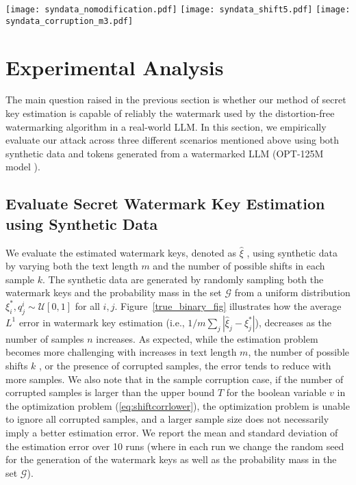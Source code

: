 \begin{figure*}[ht]
    \centering
    \texttt{[image: syndata\_nomodification.pdf]}
    \texttt{[image: syndata\_shift5.pdf]}
    \texttt{[image: syndata\_corruption\_m3.pdf]}
    \caption{Average estimation error for the watermark keys versus sample sizes, in the no-alteration (left), the shifting case (center), and the sample corruption case (right), using synthetic data. The estimation error decreases as more samples $n$ are available, although the text length $m$, the potential shift $k$ and the number of corrupted samples make the estimation problem more challenging. We report the mean and standard deviation over 10 runs (see text for more details).}
    \label{true_binary_fig}
\end{figure*}

\section{Experimental Analysis}
\label{sec:experiment}

The main question raised in the previous section is whether our method of secret key estimation is capable of reliably  the watermark used by the distortion-free watermarking algorithm \citep{kuditipudi2024robust} in a real-world LLM. In this section, we empirically evaluate our  attack across three different scenarios mentioned above using both synthetic data and tokens generated from a watermarked LLM (OPT-125M model \citealt{zhang2022opt}). 


\subsection{Evaluate Secret Watermark Key Estimation using Synthetic Data}

We evaluate the estimated watermark keys, denoted as $\hat{\xi}$ , using synthetic data by varying both the text length $m$ and the number of possible shifts in each sample $k$. The synthetic data are generated by randomly sampling both the watermark keys and the probability mass in the set $\mathcal{G}$ from a uniform distribution $\xi^*_i, q^i_j \sim \mathcal{U}[0,1]$ for all $i, j$. Figure~\ref{true_binary_fig} illustrates how the average $L^1$ error in watermark key estimation (i.e., $1/m \sum_j |\hat{\xi}_j - \xi^*_j |$), decreases as the number of samples $n$ increases. As expected, while the estimation problem becomes more challenging with increases in text length $m$, the number of possible shifts $k$ , or the presence of corrupted samples, the error tends to reduce with more samples. We also note that in the sample corruption case, if the number of corrupted samples is larger than the upper bound $T$ for the boolean variable $v$ in the optimization problem (\ref{eq:shiftcorrlower}), the optimization problem is unable to ignore all corrupted samples, and a larger sample size does not necessarily imply a better estimation error. We report the mean and standard deviation of the estimation error over 10 runs (where in each run we change the random seed for the generation of the watermark keys as well as the probability mass in the set $\mathcal{G}$).


